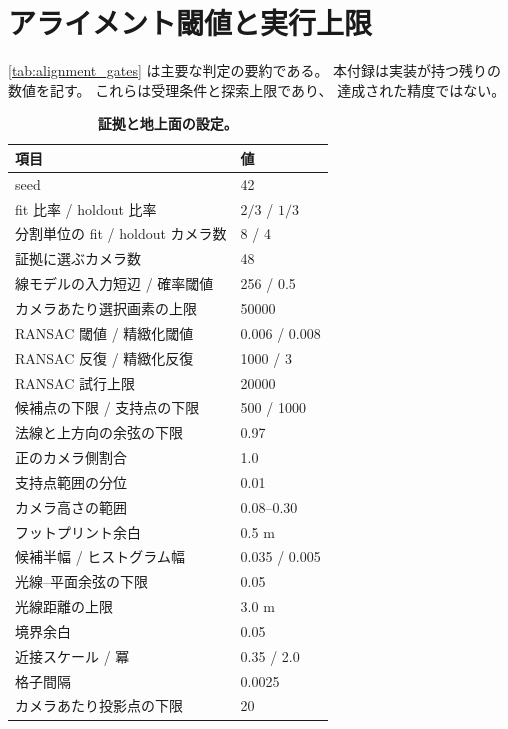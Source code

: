 \section{アライメント閾値と実行上限}
\label{app:thresholds}

\cref{tab:alignment_gates} は主要な判定の要約である。
本付録は実装が持つ残りの数値を記す。
これらは受理条件と探索上限であり、
達成された精度ではない。

\begin{table}[h]
  \centering
  \caption{\textbf{証拠と地上面の設定。}}
  \label{tab:thresholds_evidence}
  \small
  \begin{tabular}{@{}ll@{}}
    \toprule
    項目 & 値 \\
    \midrule
    seed & 42 \\
    fit 比率 / holdout 比率 & \(2/3\) / \(1/3\) \\
    分割単位の fit / holdout カメラ数 & 8 / 4 \\
    証拠に選ぶカメラ数 & 48 \\
    線モデルの入力短辺 / 確率閾値 & 256 / 0.5 \\
    カメラあたり選択画素の上限 & 50000 \\
    RANSAC 閾値 / 精緻化閾値 & 0.006 / 0.008 \\
    RANSAC 反復 / 精緻化反復 & 1000 / 3 \\
    RANSAC 試行上限 & 20000 \\
    候補点の下限 / 支持点の下限 & 500 / 1000 \\
    法線と上方向の余弦の下限 & 0.97 \\
    正のカメラ側割合 & 1.0 \\
    支持点範囲の分位 & 0.01 \\
    カメラ高さの範囲 & 0.08--0.30 \\
    フットプリント余白 & 0.5 m \\
    候補半幅 / ヒストグラム幅 & 0.035 / 0.005 \\
    光線--平面余弦の下限 & 0.05 \\
    光線距離の上限 & 3.0 m \\
    境界余白 & 0.05 \\
    近接スケール / 冪 & 0.35 / 2.0 \\
    格子間隔 & 0.0025 \\
    カメラあたり投影点の下限 & 20 \\
    \bottomrule
  \end{tabular}
\end{table}

